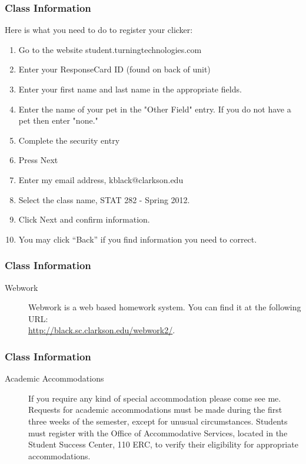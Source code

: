 \begin{frame}
  \frametitle{Class Information}

 Here is what you need to do to register your clicker:
\begin{enumerate}
\item Go to the website student.turningtechnologies.com
\item Enter your ResponseCard ID (found on back of unit)
\item Enter your first name and last name in the appropriate fields. 
\item Enter the name of your pet in the "Other Field" entry. If you do not have a pet then enter "none."
\item Complete the security entry
\item Press Next
\item Enter my email address, kblack@clarkson.edu 
\item Select the class name, STAT 282 - Spring 2012. 
\item Click Next and confirm information. 
\item You may click ``Back'' if you find information you need to correct.
\end{enumerate}

\end{frame}

\begin{frame}
  \frametitle{Class Information}

\begin{description}
  \item[Webwork] Webwork is a web based homework system. You can find
    it at the following URL: \\
    \url{http://black.sc.clarkson.edu/webwork2/}.
\end{description}

\end{frame}


\begin{frame}
  \frametitle{Class Information}

\begin{description}
  \item[Academic Accommodations] If you require any kind of special
    accommodation please come see me.  Requests for academic
    accommodations must be made during the first three weeks of the
    semester, except for unusual circumstances.  Students must
    register with the Office of Accommodative Services, located in the
    Student Success Center, 110 ERC, to verify their eligibility for
    appropriate accommodations.


\end{description}


\end{frame}

